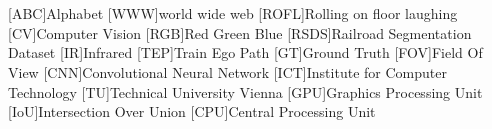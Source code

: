 {}
\chapter*{\listacroname}
\begin{acronym}[XXXXX]
    [ABC]{Alphabet}
    [WWW]{world wide web}
    [ROFL]{Rolling on floor laughing}
    [CV]{Computer Vision}
    [RGB]{Red Green Blue}
    [RSDS]{Railroad Segmentation Dataset}
    [IR]{Infrared}
    [TEP]{Train Ego Path}
    [GT]{Ground Truth}
    [FOV]{Field Of View}
    [CNN]{Convolutional Neural Network}
    [ICT]{Institute for Computer Technology}
    [TU]{Technical University Vienna}
    [GPU]{Graphics Processing Unit}
    [IoU]{Intersection Over Union}
    [CPU]{Central Processing Unit}
\end{acronym}